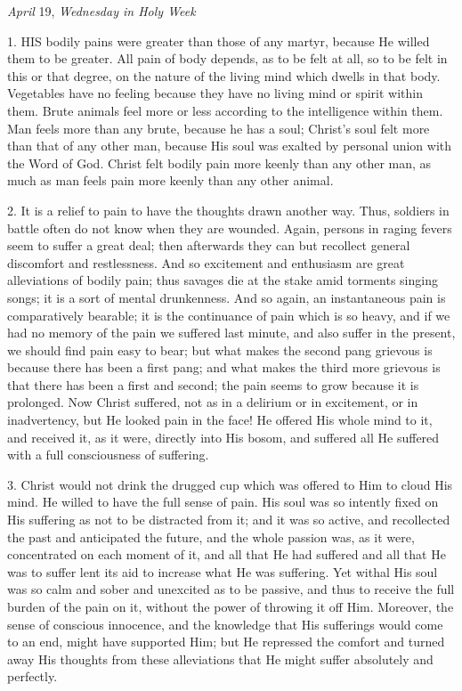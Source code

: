
\emph{April}
19, \emph{Wednesday in Holy Week}

1. HIS
bodily pains were greater than those of any martyr, because He willed
them to be greater. All pain of body depends, as to be felt at all, so
to be felt in this or that degree, on the nature of the living mind
which dwells in that body. Vegetables have no feeling because they have
no living mind or spirit within them. Brute animals feel more or less
according to the intelligence within them. Man feels more than any
brute, because he has a soul; Christ's soul felt more than that of any
other man, because His soul was exalted by personal union with the Word
of God. Christ felt bodily pain more keenly than any other man, as much
as man feels pain more keenly than any other animal.

2. It is a relief to pain to
have the thoughts drawn another way. Thus, soldiers in battle often do
not know when they are wounded. Again, persons in raging fevers
seem to suffer a great deal; then afterwards they can but recollect
general discomfort and restlessness. And so excitement and enthusiasm
are great alleviations of bodily pain; thus savages die at the stake
amid torments singing songs; it is a sort of mental drunkenness. And so
again, an instantaneous pain is comparatively bearable; it is the
continuance of pain which is so heavy, and if we had no memory of the
pain we suffered last minute, and also suffer in the present, we should
find pain easy to bear; but what makes the second pang grievous is
because there has been a first pang; and what makes the third more
grievous is that there has been a first and second; the pain seems to
grow because it is prolonged. Now Christ suffered, not as in a delirium
or in excitement, or in inadvertency, but He looked pain in the face! He
offered His whole mind to it, and received it, as it were, directly into
His bosom, and suffered all He suffered with a full consciousness of
suffering.

3. Christ would not drink the
drugged cup which was offered to Him to cloud His mind. He willed to
have the full sense of pain. His soul was so intently fixed on His
suffering as not to be distracted from it; and it was so active, and
recollected the past and anticipated the future, and the whole passion
was, as it were, concentrated on each moment of it, and all that He had
suffered and all that He was to suffer lent its aid to increase what He
was suffering. Yet withal His soul was so calm and sober and unexcited
as to be passive, and thus to receive the full burden of the pain
on it, without the power of throwing it off Him. Moreover, the sense of
conscious innocence, and the knowledge that His sufferings would come to
an end, might have supported Him; but He repressed the comfort and
turned away His thoughts from these alleviations that He might suffer
absolutely and perfectly.

